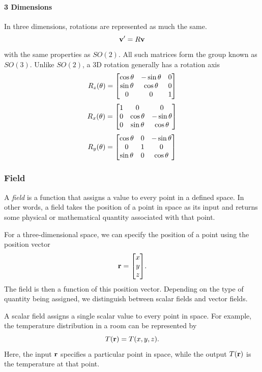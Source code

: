 			\paragraph{3 Dimensions}
				In three dimensions, rotations are represented as much the same.
				\[
					\vb{v}' = R \vb{v}
				\]
				with the same properties as $SO(2)$. All such matrices form the group
				known as $SO(3)$. Unlike $SO(2)$, a 3D rotation generally has a rotation axis
				\begin{equation}
					R_z(\theta) = \mqty[
						\cos\theta & -\sin\theta & 0 \\
						\sin\theta & \cos\theta & 0 \\
						0 & 0 & 1
					]
				\end{equation}
				\begin{equation}
					R_x(\theta) = \mqty[
						1 & 0 & 0 \\
						0 & \cos\theta & -\sin\theta\\
						0 & \sin\theta & \cos\theta
					]
				\end{equation}
				\begin{equation}
					R_y(\theta) = \mqty[
					\cos\theta & 0 & -\sin\theta \\
					0 & 1 & 0 \\
					\sin\theta & 0 &  \cos\theta 
					]
				\end{equation}
			\newpage
    \subsubsection{Field}
		A \textit{field} is a function that assigns a value to every point in a
		defined space. In other words, a field takes the position of a point in
		space as its input and returns some physical or mathematical quantity
		associated with that point.

		For a three-dimensional space, we can specify the position of a point
		using the position vector
		\[
			\vb{r} =
			\mqty[
				x\\
				y\\
				z
			].
		\]
		The field is then a function of this position vector. Depending on the
		type of quantity being assigned, we distinguish between scalar fields
		and vector fields.

			A scalar field assigns a single scalar
			value to every point in space. For example, the temperature
			distribution in a room can be represented by
			\[
				T(\vb{r}) = T(x,y,z).
			\]
			Here, the input $\vb{r}$ specifies a particular point in space,
			while the output $T(\vb{r})$ is the temperature at that point.

